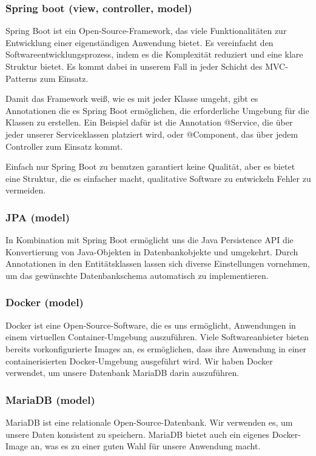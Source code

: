\subsubsection{Spring boot (view, controller, model)}
Spring Boot ist ein Open-Source-Framework, das viele Funktionalitäten zur Entwicklung einer eigenständigen Anwendung bietet. Es vereinfacht den Softwareentwicklungsprozess, indem es die Komplexität reduziert und eine klare Struktur bietet. Es kommt dabei in unserem Fall in jeder Schicht des MVC-Patterns zum Einsatz.

Damit das Framework weiß, wie es mit jeder Klasse umgeht, gibt es Annotationen die es Spring Boot ermöglichen, die erforderliche Umgebung für die Klassen zu erstellen. Ein Beispiel dafür ist die Annotation @Service, die über jeder unserer Serviceklassen platziert wird, oder @Component, das über jedem Controller zum Einsatz kommt.

Einfach nur Spring Boot zu benutzen garantiert keine Qualität, aber es bietet eine Struktur, die es einfacher macht, qualitative Software zu entwickeln Fehler zu vermeiden.

\subsubsection{JPA (model)}
In Kombination mit Spring Boot ermöglicht uns die Java Persistence API die Konvertierung von Java-Objekten in
Datenbankobjekte und umgekehrt. Durch Annotationen in den Entitätsklassen lassen sich diverse Einstellungen vornehmen, um das gewünschte Datenbankschema automatisch zu implementieren.

\subsubsection{Docker (model)}
Docker ist eine Open-Source-Software, die es uns ermöglicht, Anwendungen in einem virtuellen Container-Umgebung auszuführen. Viele Softwareanbieter bieten bereits vorkonfigurierte Images an, es ermöglichen, dass ihre Anwendung in einer containerisierten Docker-Umgebung ausgeführt wird. 
Wir haben Docker verwendet, um unsere Datenbank MariaDB darin auszuführen.

\subsubsection{MariaDB (model)}
MariaDB ist eine relationale Open-Source-Datenbank. Wir verwenden es, um unsere Daten konsistent zu speichern. MariaDB bietet auch ein eigenes Docker-Image an, was es zu einer guten Wahl für unsere Anwendung macht.

